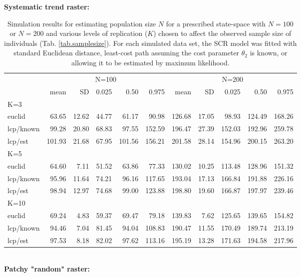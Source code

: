 \documentclass[12pt]{article}
\begin{document}
\begin{table}[ht]
{\small
\caption{Simulation results for estimating population size $N$ for a prescribed state-space with
$N=100$ or $N=200$ and various levels of replication ($K$) chosen to affect the observed sample
size of individuals (Tab. \ref{tab.samplesize}). For each simulated data set, the SCR model was fitted with
standard Euclidean distance, least-cost path assuming the cost parameter $\theta_2$ is known, or allowing it to
be estimated by maximum likelihood.}
{\bf Systematic trend raster:} \\
\begin{tabular}{l|rrrrr|rrrrr}
         & \multicolumn{5}{c}{N=100   } & \multicolumn{5}{c}{N=200  }  \\
         &   mean &  SD  & 0.025 & 0.50 & 0.975  & mean  & SD   & 0.025 & 0.50  & 0.975 \\ \hline
K=3      &        &      &       &      &        &       &      &       &       &       \\
euclid   &   63.65& 12.62& 44.77 & 61.17&  90.98 & 126.68& 17.05&  98.93& 124.49& 168.26 \\
lcp/known&   99.28& 20.80& 68.83 & 97.55& 152.59 & 196.47& 27.39& 152.03& 192.96& 259.78\\
lcp/est  &  101.93& 21.68& 67.95 &101.56& 156.21 & 201.58& 28.14& 154.96& 200.15& 263.20\\
K=5      &        &      &       &      &        &       &      &       &       &        \\
euclid   &  64.60 & 7.11 & 51.52 & 63.86&  77.33 & 130.02& 10.25& 113.48& 128.96& 151.32\\
lcp/known&  95.96 &11.64 & 74.21 & 96.16& 117.65 & 193.04& 17.13& 166.84& 191.88& 226.16\\
lcp/est  &  98.94 &12.97 & 74.68 & 99.00& 123.88 & 198.80& 19.60& 166.87& 197.97& 239.46\\
K=10     &        &      &       &      &        &       &      &       &       &       \\
euclid   &  69.24 & 4.83 & 59.37 & 69.47&  79.18 & 139.83&  7.62& 125.65& 139.65& 154.82\\
lcp/known&  94.46 & 7.04 & 81.45 & 94.04& 108.83 & 190.47& 11.55& 170.49& 189.74& 213.19\\
lcp/est  &  97.53 & 8.18 & 82.02 & 97.62& 113.16 & 195.19& 13.28& 171.63& 194.58& 217.96\\ \hline
\end{tabular} 
\\
{\bf Patchy "random" raster: } \\
}
\end{table}
\end{document}
